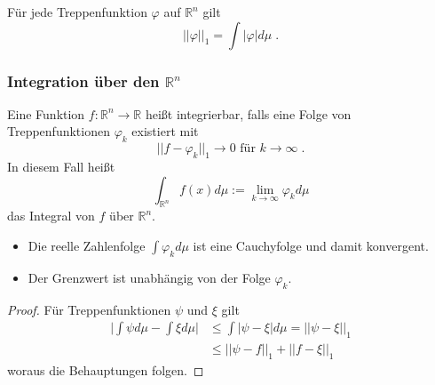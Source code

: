 \begin{Lemma}
\label{normbetragintegral}
Für jede Treppenfunktion $\varphi$ auf $\mathbb{R}^n$ gilt
$$ || \varphi ||_1 = \int | \varphi | d \mu  \; .$$
\end{Lemma}


\subsubsection{Integration über den $\mathbb{R}^n$}

\begin{Definition}
Eine Funktion $f : \mathbb{R}^n \to \mathbb{R}$ heißt integrierbar, falls eine Folge von Treppenfunktionen  $\varphi_k$ existiert mit
$$ || f -  \varphi_k ||_1 \to 0 \text{ für } k \to \infty \;. $$
In diesem Fall heißt
$$ \int_{\mathbb{R}^n} f(x) d \mu := \lim_{k \to \infty} \varphi_k d \mu$$
das Integral von $f$ über $\mathbb{R}^n$.
\end{Definition}

\begin{Bemerkung}
\hfill
\begin{itemize}
\item Die reelle Zahlenfolge $\int \varphi_k d\mu$ ist eine Cauchyfolge und damit konvergent. 
\item Der Grenzwert ist unabhängig von der Folge $\varphi_k$.
\end{itemize}

\end{Bemerkung}
\begin{proof}
Für Treppenfunktionen $\psi$ und $\xi$ gilt 
\begin{align*}
\biggl | \int \psi d \mu - \int \xi d \mu \biggr |  &  \leq \int | \psi - \xi | d \mu = || \psi - \xi ||_1 \\
& \leq  || \psi - f ||_1 +  || f - \xi ||_1
\end{align*}
woraus die Behauptungen folgen.
\end{proof}


